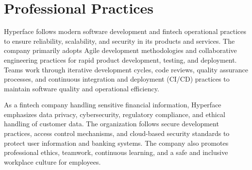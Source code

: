 \section{Professional Practices}
Hyperface follows modern software development and fintech operational practices to ensure reliability, scalability, and security in its products and services. The company primarily adopts Agile development methodologies and collaborative engineering practices for rapid product development, testing, and deployment. Teams work through iterative development cycles, code reviews, quality assurance processes, and continuous integration and deployment (CI/CD) practices to maintain software quality and operational efficiency.

As a fintech company handling sensitive financial information, Hyperface emphasizes data privacy, cybersecurity, regulatory compliance, and ethical handling of customer data. The organization follows secure development practices, access control mechanisms, and cloud-based security standards to protect user information and banking systems. The company also promotes professional ethics, teamwork, continuous learning, and a safe and inclusive workplace culture for employees.
